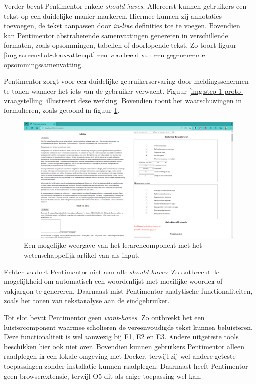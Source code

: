 Verder bevat Pentimentor enkele \textit{should-haves}. Allereerst kunnen gebruikers een tekst op een duidelijke manier markeren. Hiermee kunnen zij annotaties toevoegen, de tekst aanpassen door \textit{in-line} definities toe te voegen. Bovendien kan Pentimentor abstraherende samenvattingen genereren in verschillende formaten, zoals opsommingen, tabellen of doorlopende tekst. Zo toont figuur \ref{img:screenshot-docx-attempt} een voorbeeld van een gegenereerde opsommingssamenvatting.

\medspace

Pentimentor zorgt voor een duidelijke gebruikerservaring door meldingsschermen te tonen wanneer het iets van de gebruiker verwacht. Figuur \ref{img:step-1-proto-vraagstelling} illustreert deze werking. Bovendien toont het waarschuwingen in formulieren, zoals getoond in figuur \ref{img:proto-lerarencomponent}.

\begin{figure}[H]
    \includegraphics[width=\linewidth]{img/proto-lerarencomponent.png}
    \caption{Een mogelijke weergave van het lerarencomponent met het wetenschappelijk artikel van \textcite{VanBrakel2022} als input.}
    \label{img:proto-lerarencomponent}
\end{figure}

Echter voldoet Pentimentor niet aan alle \textit{should-haves}. Zo ontbreekt de mogelijkheid om automatisch een woordenlijst met moeilijke woorden of vakjargon te genereren. Daarnaast mist Pentimentor analytische functionaliteiten, zoals het tonen van tekstanalyse aan de eindgebruiker.

\medspace

Tot slot bevat Pentimentor geen \textit{wont-haves}. Zo ontbreekt het een luistercomponent waarmee scholieren de vereenvoudigde tekst kunnen beluisteren. Deze functionaliteit is wel aanwezig bij E1, E2 en E3. Andere uitgeteste tools beschikken hier ook niet over. Bovendien kunnen gebruikers Pentimentor alleen raadplegen in een lokale omgeving met Docker, terwijl zij wel andere geteste toepassingen zonder installatie kunnen raadplegen. Daarnaast heeft Pentimentor geen browserextensie, terwijl O5 dit als enige toepassing wel kan.